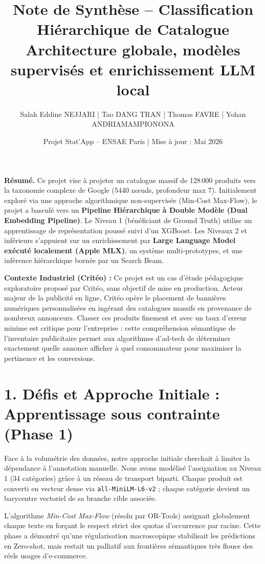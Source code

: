 \documentclass[11pt,a4paper]{article}
\title{\vspace{-1.2cm}\textbf{Note de Synthèse -- Classification Hiérarchique de Catalogue}\\
\large Architecture globale, modèles supervisés et enrichissement LLM local}
\author{\small Salah Eddine NEJJARI \;|\; Tao DANG TRAN \;|\; Thomas FAVRE \;|\; Yohan ANDRIAMAMPIONONA}
\date{\small Projet Stat'App -- ENSAE Paris \;|\; Mise à jour : Mai 2026}
\begin{document}
\maketitle
\vspace{-0.9cm}

\small
\textbf{Résumé.} Ce projet vise à projeter un catalogue massif de 128\,000 produits vers la taxonomie complexe de Google (5440 nœuds, profondeur max 7). Initialement exploré via une approche algorithmique non-supervisée (Min-Cost Max-Flow), le projet a basculé vers un \textbf{Pipeline Hiérarchique à Double Modèle (Dual Embedding Pipeline)}. Le Niveau 1 (bénéficiant de Ground Truth) utilise un apprentissage de représentation poussé suivi d'un XGBoost. Les Niveaux 2 et inférieurs s'appuient sur un enrichissement par \textbf{Large Language Model exécuté localement (Apple MLX)}, un système multi-prototypes, et une inférence hiérarchique bornée par un Search Beam.

\vspace{0.2cm}
\textbf{Contexte Industriel (Critéo) :} Ce projet est un cas d'étude pédagogique exploratoire proposé par Critéo, sans objectif de mise en production. Acteur majeur de la publicité en ligne, Critéo opère le placement de bannières numériques personnalisées en ingérant des catalogues massifs en provenance de nombreux annonceurs. Classer ces produits finement et avec un taux d'erreur minime est critique pour l'entreprise : cette compréhension sémantique de l'inventaire publicitaire permet aux algorithmes d'ad-tech de déterminer exactement quelle annonce afficher à quel consommateur pour maximiser la pertinence et les conversions.
\vspace{0.2cm}

\section{1. Défis et Approche Initiale : Apprentissage sous contrainte (Phase 1)}
Face à la volumétrie des données, notre approche initiale cherchait à limiter la dépendance à l'annotation manuelle. Nous avons modélisé l'assignation au Niveau 1 (34 catégories) grâce à un réseau de transport biparti. Chaque produit est converti en vecteur dense via \texttt{all-MiniLM-L6-v2} ; chaque catégorie devient un barycentre vectoriel de sa branche cible associée. 

L'algorithme \textit{Min-Cost Max-Flow} (résolu par OR-Tools) assignait globalement chaque texte en forçant le respect strict des quotas d'occurrence par racine. Cette phase a démontré qu'une régularisation macroscopique stabilisait les prédictions en Zero-shot, mais restait un palliatif aux frontières sémantiques très floues des réels usages d'e-commerce.
\end{document}
